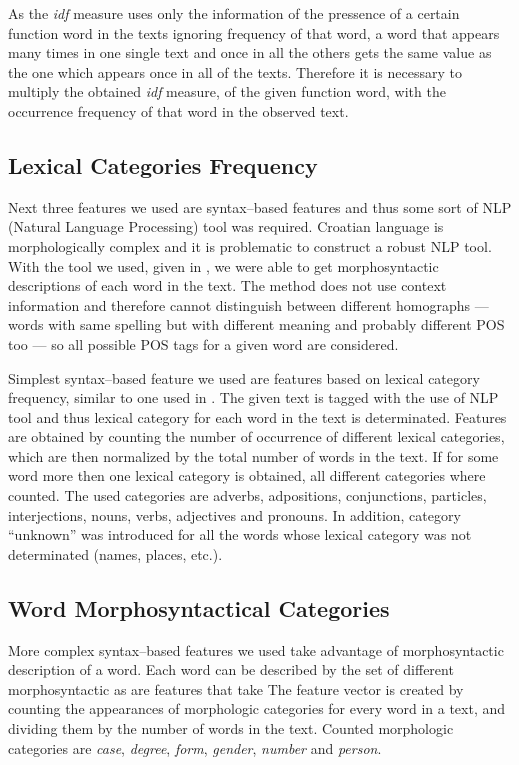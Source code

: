 \documentclass{llncs}
\begin{document}
As the \emph{idf} measure uses only the information of the pressence of a
certain function word in the texts ignoring frequency of that word, a word that appears
many times in one single text and once in all the others gets the same value as
the one which appears once in all of the texts. Therefore it is necessary to
multiply the obtained \emph{idf} measure, of the given function word, with the
occurrence frequency of that word in the observed text.

\subsection{Lexical Categories Frequency}
\label{sec:rijeci-grupe}
Next three features we used are syntax--based features and thus some sort of NLP
(Natural Language Processing) tool was required. Croatian language is
morphologically complex and it is problematic to construct a robust NLP tool.
With the tool we used, given in \cite{snajder08automatic}, we were able to get
morphosyntactic descriptions of each word in the text. The method does not
use context information and therefore cannot distinguish between different
homographs --- words with same spelling but with different meaning and probably
different POS too --- so all possible POS tags for a given word are considered.

Simplest syntax--based feature we used are features based on lexical category
frequency, similar to one used in \cite{kukushkina2001using}. The given text is
tagged with the use of NLP tool and thus lexical category for each word in the text is determinated. Features are obtained by
counting the number of occurrence of different lexical categories, which are
then normalized by the total number of words in the text. If for some word more
then one lexical category is obtained, all different categories where counted. 
The used categories are adverbs, adpositions, conjunctions, particles,
interjections, nouns, verbs, adjectives and pronouns. In addition, category
``unknown'' was introduced for all the words whose lexical category was not
determinated (names, places, etc.).

\subsection{Word Morphosyntactical Categories}
\label{sec:morphosyntactic}

More complex syntax--based features we used take advantage of morphosyntactic
description of a word. Each word can be described by the set of different
morphosyntactic as are features that take The feature vector is created by
counting the appearances of morphologic categories for every word in a text, and dividing them by the number of words in
the text. Counted morphologic categories are \emph{case}, \emph{degree},
\emph{form}, \emph{gender}, \emph{number} and \emph{person}.
\end{document}
